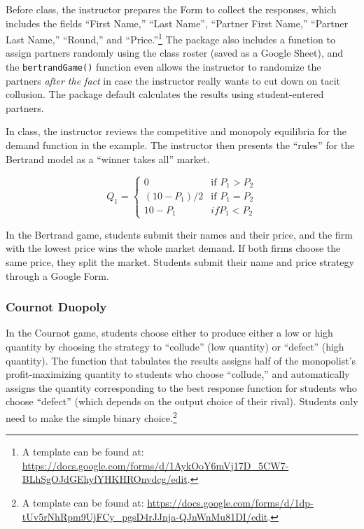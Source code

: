 \documentclass[
]{article}
\begin{document}
Before class, the instructor prepares the Form to collect the responses,
which includes the fields ``First Name,'' ``Last Name'', ``Partner First
Name,'' ``Partner Last Name,'' ``Round,'' and ``Price.''\footnote{A
  template can be found at:
  \url{https://docs.google.com/forms/d/1AykOoY6mVj17D_5CW7-BLhSgOJdGEhyfYHKHROnvdcg/edit}.}
The package also includes a function to assign partners randomly using
the class roster (saved as a Google Sheet), and the
\texttt{bertrandGame()} function even allows the instructor to randomize
the partners \emph{after the fact} in case the instructor really wants
to cut down on tacit collusion. The package default calculates the
results using student-entered partners.

In class, the instructor reviews the competitive and monopoly equilibria
for the demand function in the example. The instructor then presents the
``rules'' for the Bertrand model as a ``winner takes all'' market.

\[
Q_1 = \begin{cases}
    0 & \text{if } P_1 > P_2 \\ %
    (10 - P_1)/2 & \text{if } P_1 = P_2 \\
    10 - P_1 & if P_1 < P_2 
\end{cases}
\]

In the Bertrand game, students submit their names and their price, and
the firm with the lowest price wins the whole market demand. If both
firms choose the same price, they split the market. Students submit
their name and price strategy through a Google Form.

\hypertarget{cournot-duopoly}{%
\subsubsection{Cournot Duopoly}\label{cournot-duopoly}}

In the Cournot game, students choose either to produce either a low or
high quantity by choosing the strategy to ``collude'' (low quantity) or
``defect'' (high quantity). The function that tabulates the results
assigns half of the monopolist's profit-maximizing quantity to students
who choose ``collude,'' and automatically assigns the quantity
corresponding to the best response function for students who choose
``defect'' (which depends on the output choice of their rival). Students
only need to make the simple binary choice.\footnote{A template can be
  found at:
  \url{https://docs.google.com/forms/d/1dp-tUv5rNhRpm9UjFCy_pgsD4rJJnja-QJnWnMu81DI/edit}.}
\end{document}
